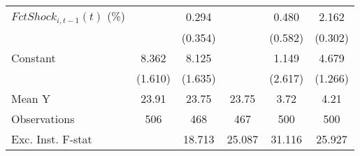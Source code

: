 {\begin{tabular}{l*{5}{c}}
\addlinespace
$ FctShock_{i,t-1}(t)$ (\%)&                     &       0.294         &                     &       0.480         &       2.162\sym{***}\\
                    &                     &     (0.354)         &                     &     (0.582)         &     (0.302)         \\
\addlinespace
Constant            &       8.362\sym{***}&       8.125\sym{***}&                     &       1.149         &       4.679\sym{***}\\
                    &     (1.610)         &     (1.635)         &                     &     (2.617)         &     (1.266)         \\
\midrule
Mean Y              &       23.91         &       23.75         &       23.75         &        3.72         &        4.21         \\
Observations        &         506         &         468         &         467         &         500         &         500         \\
Exc. Inst. F-stat   &                     &      18.713         &      25.087         &      31.116         &      25.927         \\
\bottomrule
\end{tabular}
}
